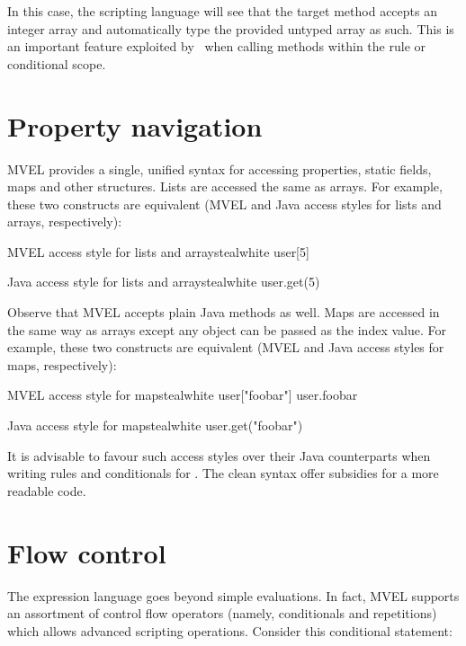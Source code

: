In this case, the scripting language will see that the target method accepts an integer array and automatically type the provided untyped array as such. This is an important feature exploited by \arara\ when calling methods within the rule or conditional scope.

\section{Property navigation}
\label{sec:propertynavigation}

MVEL provides a single, unified syntax for accessing properties, static fields, maps and other structures. Lists are accessed the same as arrays. For example, these two constructs are equivalent (MVEL and Java access styles for lists and arrays, respectively):

\begin{codebox}{MVEL access style for lists and arrays}{teal}{\icnote}{white}
user[5]
\end{codebox}

\begin{codebox}{Java access style for lists and arrays}{teal}{\icnote}{white}
user.get(5)
\end{codebox}

Observe that MVEL accepts plain Java methods as well. Maps are accessed in the same way as arrays except any object can be passed as the index value. For example, these two constructs are equivalent (MVEL and Java access styles for maps, respectively):

\begin{codebox}{MVEL access style for maps}{teal}{\icnote}{white}
user["foobar"]
user.foobar
\end{codebox}

\begin{codebox}{Java access style for maps}{teal}{\icnote}{white}
user.get("foobar")
\end{codebox}

It is advisable to favour such access styles over their Java counterparts when writing rules and conditionals for \arara. The clean syntax offer subsidies for a more readable code.

\section{Flow control}
\label{sec:mvelflowcontrol}

The expression language goes beyond simple evaluations. In fact, MVEL supports an assortment of control flow operators (namely, conditionals and repetitions) which allows advanced scripting operations. Consider this conditional statement:

